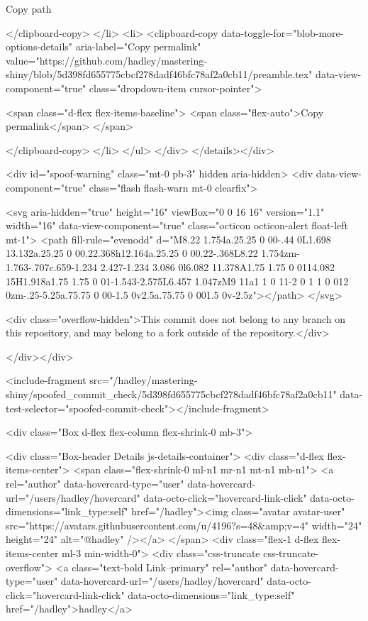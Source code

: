             Copy path

</clipboard-copy>        </li>
        <li>
          <clipboard-copy data-toggle-for="blob-more-options-details" aria-label="Copy permalink" value="https://github.com/hadley/mastering-shiny/blob/5d398fd655775cbcf278dadf46bfc78af2a0cb11/preamble.tex" data-view-component="true" class="dropdown-item cursor-pointer">
    
            <span class="d-flex flex-items-baseline">
              <span class="flex-auto">Copy permalink</span>
            </span>

</clipboard-copy>        </li>
      </ul>
</div>
</details></div>





    <div id="spoof-warning" class="mt-0 pb-3" hidden aria-hidden>
  <div data-view-component="true" class="flash flash-warn mt-0 clearfix">
  
  
    <svg aria-hidden="true" height="16" viewBox="0 0 16 16" version="1.1" width="16" data-view-component="true" class="octicon octicon-alert float-left mt-1">
    <path fill-rule="evenodd" d="M8.22 1.754a.25.25 0 00-.44 0L1.698 13.132a.25.25 0 00.22.368h12.164a.25.25 0 00.22-.368L8.22 1.754zm-1.763-.707c.659-1.234 2.427-1.234 3.086 0l6.082 11.378A1.75 1.75 0 0114.082 15H1.918a1.75 1.75 0 01-1.543-2.575L6.457 1.047zM9 11a1 1 0 11-2 0 1 1 0 012 0zm-.25-5.25a.75.75 0 00-1.5 0v2.5a.75.75 0 001.5 0v-2.5z"></path>
</svg>

      <div class="overflow-hidden">This commit does not belong to any branch on this repository, and may belong to a fork outside of the repository.</div>


  
</div></div>

    <include-fragment src="/hadley/mastering-shiny/spoofed_commit_check/5d398fd655775cbcf278dadf46bfc78af2a0cb11" data-test-selector="spoofed-commit-check"></include-fragment>

    <div class="Box d-flex flex-column flex-shrink-0 mb-3">
  
  <div class="Box-header Details js-details-container">
      <div class="d-flex flex-items-center">
        <span class="flex-shrink-0 ml-n1 mr-n1 mt-n1 mb-n1">
          <a rel="author" data-hovercard-type="user" data-hovercard-url="/users/hadley/hovercard" data-octo-click="hovercard-link-click" data-octo-dimensions="link_type:self" href="/hadley"><img class="avatar avatar-user" src="https://avatars.githubusercontent.com/u/4196?s=48&amp;v=4" width="24" height="24" alt="@hadley" /></a>
        </span>
        <div class="flex-1 d-flex flex-items-center ml-3 min-width-0">
          <div class="css-truncate css-truncate-overflow">
            <a class="text-bold Link--primary" rel="author" data-hovercard-type="user" data-hovercard-url="/users/hadley/hovercard" data-octo-click="hovercard-link-click" data-octo-dimensions="link_type:self" href="/hadley">hadley</a>

